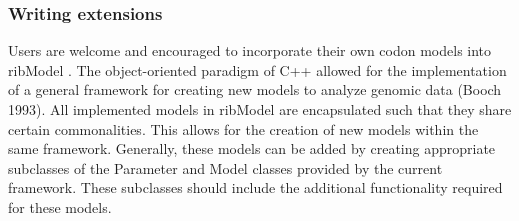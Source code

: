 \documentclass{bioinfo}
\newcommand{\package}{ribModel } %
\begin{document}
\subsubsection*{Writing extensions}
Users are welcome and encouraged to incorporate their own codon models into \package. The object-oriented paradigm of C++ allowed for the implementation of a general framework for creating new models to analyze genomic data (Booch 1993). All implemented models in \package are encapsulated such that they share certain commonalities. This allows for the creation of new models within the same framework. Generally, these models can be added by creating appropriate subclasses of the Parameter and Model classes provided by the current framework. These subclasses should include the additional functionality required for these models. 



\end{document}
